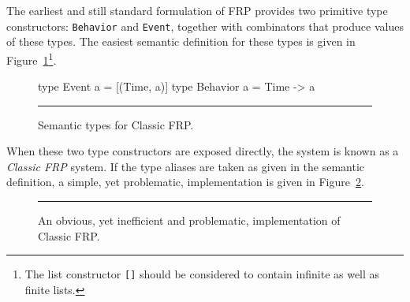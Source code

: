 The earliest and still standard formulation of FRP provides two primitive type
constructors: {\tt Behavior} and {\tt Event}, together with combinators that
produce values of these types. The easiest semantic definition for these types
is given in Figure~\ref{figure:classic_frp_semantic_types}\footnote{The list constructor {\tt []} should be considered to contain infinite as well as finite lists.}.

\begin{figure}
\begin{code}
type Event a = [(Time, a)]
type Behavior a = Time -> a
\end{code}
\hrule
\caption{Semantic types for Classic FRP.}
\label{figure:classic_frp_semantic_types}
\end{figure}


When these two type constructors are exposed directly, the system is known as a 
{\em Classic FRP} system. If the type aliases are taken as given in the semantic
definition, a simple, yet problematic, implementation is given in
Figure~\ref{figure:classic_frp_simple_implementation}.

\begin{figure}
\hrule
\caption{An obvious, yet inefficient and problematic, implementation of
Classic FRP.}
\label{figure:classic_frp_simple_implementation}
\end{figure}

